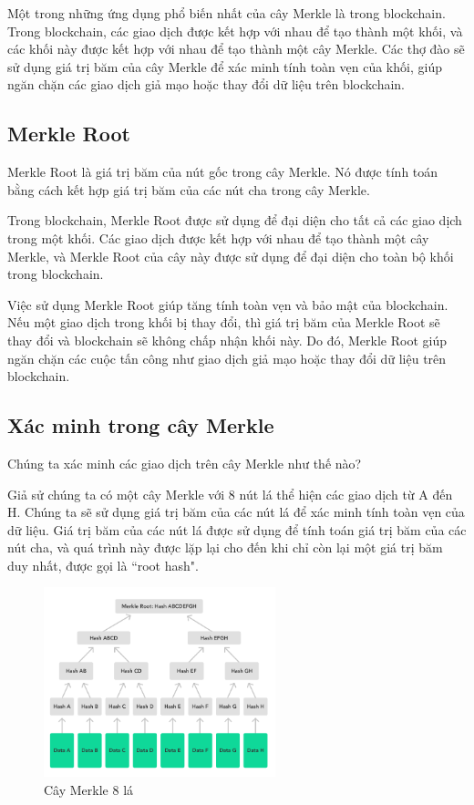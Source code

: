 Một trong những ứng dụng phổ biến nhất của cây Merkle là trong blockchain. Trong blockchain,
các giao dịch được kết hợp với nhau để tạo thành một khối, và các khối này được kết hợp với nhau 
để tạo thành một cây Merkle. Các thợ đào sẽ sử dụng giá trị băm của cây Merkle để xác minh tính 
toàn vẹn của khối, giúp ngăn chặn các giao dịch giả mạo hoặc thay đổi dữ liệu trên blockchain.


\subsection{Merkle Root}

Merkle Root là giá trị băm  của nút gốc trong cây Merkle. Nó được tính toán 
bằng cách kết hợp giá trị băm của các nút cha trong cây Merkle.

Trong blockchain, Merkle Root được sử dụng để đại diện cho tất cả các giao dịch trong một khối. 
Các giao dịch được kết hợp với nhau để tạo thành một cây Merkle, và Merkle Root của cây này 
được sử dụng để đại diện cho toàn bộ khối trong blockchain.

Việc sử dụng Merkle Root giúp tăng tính toàn vẹn và bảo mật của blockchain. Nếu một giao dịch trong khối bị thay đổi, thì giá trị băm của Merkle Root sẽ thay đổi và blockchain sẽ không chấp nhận khối này. Do đó, Merkle Root giúp ngăn chặn các cuộc tấn công như giao dịch giả mạo hoặc thay đổi dữ liệu trên blockchain.

\subsection{Xác minh trong cây Merkle }

Chúng ta xác minh các giao dịch trên cây Merkle như thế nào?

Giả sử chúng ta có một cây Merkle với 8 nút lá thể hiện các giao dịch từ A đến H. Chúng ta sẽ sử dụng giá trị băm 
của các nút lá để xác minh tính toàn vẹn của dữ liệu. Giá trị băm của các nút lá 
được sử dụng để tính toán giá trị băm của các nút cha, và quá trình này được lặp 
lại cho đến khi chỉ còn lại một giá trị băm duy nhất, được gọi là ``root hash". 

\begin{figure}[h]
    \centering
    \includegraphics[width=0.6\textwidth]{images/merkle-tree-8levels.png}
    \caption{Cây Merkle 8 lá}
    \label{fig:merkle_tree_8levels}
\end{figure}


